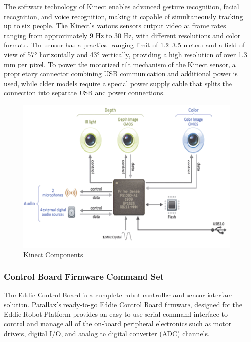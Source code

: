 The software technology of Kinect enables advanced gesture recognition, facial recognition, and voice recognition, making it capable of simultaneously tracking up to six people. The Kinect's various sensors output video at frame rates ranging from approximately 9 Hz to 30 Hz, with different resolutions and color formats. The sensor has a practical ranging limit of 1.2–3.5 meters and a field of view of 57° horizontally and 43° vertically, providing a high resolution of over 1.3 mm per pixel. To power the motorized tilt mechanism of the Kinect sensor, a proprietary connector combining USB communication and additional power is used, while older models require a special power supply cable that splits the connection into separate USB and power connections.
\begin{figure}[H]
	\centering
	\includegraphics[width=0.8\linewidth]{figures/kinect-components.png}
	\caption{Kinect Components}
	\label{fig:kinectComponents}
\end{figure}
\subsubsection{Control Board Firmware Command Set}
The Eddie Control Board is a complete robot controller and sensor-interface solution. Parallax’s ready-to-go Eddie Control Board firmware, designed for the Eddie Robot Platform provides an easy-to-use serial command interface to control and manage all of the on-board peripheral electronics such as motor drivers, digital I/O, and analog to digital converter (ADC) channels.

